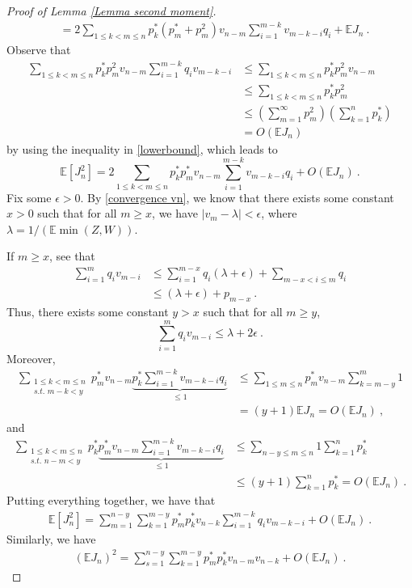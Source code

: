 \documentclass[12pt]{article}
\newcommand{\E}{\mathbb{E}}
\numberwithin{equation}{section} \font\titre=cmbx12
\begin{document}
\begin{proof}[Proof of Lemma \ref{Lemma second moment}]
\begin{align}
    &= 2\sum_{1\le k < m \le n} p_k^* (p_m^*+p_m^2)v_{n-m}\sum_{i=1}^{m-k}v_{m-k - i}q_i+ \E J_n ~.
\end{align}
Observe that
\begin{align}
    \sum_{1 \le k < m \le n}p_k^*p_m^2v_{n-m}\sum_{i=1}^{m-k}q_iv_{m-k-i} &\le \sum_{1 \le k < m \le n}p_k^*p_m^2v_{n-m} \nonumber \\
    &\le  \sum_{1 \le k < m \le n}p_k^*p_m^2 \nonumber \\
    &\le \left( \sum_{m=1}^\infty p_m ^2\right) \left(\sum_{k=1}^n p_k^*\right) \nonumber \\
    &=  O\left( \E J_n\right) \nonumber
\end{align}     
by using the inequality in \eqref{lowerbound}, which leads to 
\begin{equation}
    \E[J_n^2] = 2\sum_{1\le k < m \le n} p_k^*p_m^*v_{n-m}\sum_{i=1}^{m-k}v_{m-k-i}q_i+ O\left( \E J_n \right)~.
\end{equation}
Fix some $\epsilon >0$. By \eqref{convergence vn}, we know that there exists some constant $x>0$ such that for all $m \ge x$, we have $|v_m-\lambda|<\epsilon$,  where $\lambda = 1/(\E\min(Z,W))$.

\noindent If $m\ge x$, see that
\begin{align*}
    \sum_{i=1}^m q_i v_{m-i} &\le \sum_{i=1}^{m-x} q_i (\lambda + \epsilon) + \sum_{m-x<i\le m} q_i \\
    &\le (\lambda + \epsilon) + p_{m-x}~.
\end{align*} 
Thus, there exists some constant $y>x$ such that for all $m \ge y$,
$$ \sum_{i=1}^m q_i v_{m-i}\le \lambda + 2 \epsilon~.$$
Moreover,
\begin{align*}
    \sum_{\substack{1\le k < m \le n \\ \textit{s.t. } m-k < y} }p_m^*v_{n-m}\underbrace{p_k^*\sum_{i=1}^{m-k}v_{m-k-i}q_i}_{\le 1}  
    &\le \sum_{1\le m \le n}p_m^* v_{n-m} \sum_{k=m-y}^m 1 \\
    &= (y+1) \E J_n = O\left( \E J_n\right)~,
\end{align*}
and 
\begin{align*}
    \sum_{\substack{1\le k < m \le n \\ \textit{s.t. } n-m < y} }p_k^*\underbrace{p_m^*v_{n-m}\sum_{i=1}^{m-k}v_{m-k-i}q_i}_{\le 1} &\le \sum_{n-y\le m \le n}1 \sum_{k=1}^n p_k^* \\
    &\le (y+1) \sum_{k=1}^n p_k^*
    = O\left( \E J_n\right)~.
\end{align*}
Putting everything together, we have that 
\begin{align}
    \E [J_n^2] = \sum_{m=1}^{n-y}\sum_{k=1}^{m-y} p_m^*p_k^*v_{n-k}\sum_{i=1}^{m-k} q_i v_{m-k-i} + O\left( \E J_n\right)~. \label{equivalent 1}
\end{align}
Similarly, we have
\begin{align}
    (\E J_n)^2 = \sum_{s=1}^{n-y}\sum_{k=1}^{m-y} p_m^*p_k^*v_{n-m}v_{n-k} + O\left( \E J_n\right)~. \label{equivalent 2}
\end{align}


\end{proof}
\end{document}
